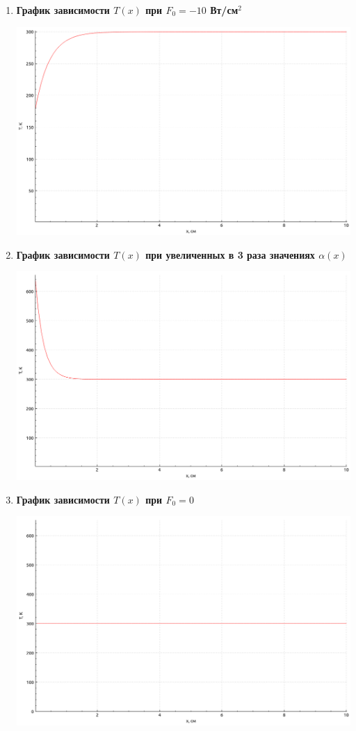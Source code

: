 \documentclass[a4paper,oneside,12pt]{extreport}
\begin{document}
\begin{enumerate}
	\item \textbf{График зависимости $T(x)$ при $F_0=-10$ Вт/см$^2$}

	\includegraphics[width=\linewidth]{inc/img/graph2}


	\item \textbf{График зависимости $T(x)$ при увеличенных в 3 раза значениях $\alpha(x)$}

	\includegraphics[width=\linewidth]{inc/img/graph3}

	\pagebreak
	\item \textbf{График зависимости $T(x)$ при $F_0=0$}

	\includegraphics[width=\linewidth]{inc/img/graph4}
\end{enumerate}
\end{document}
